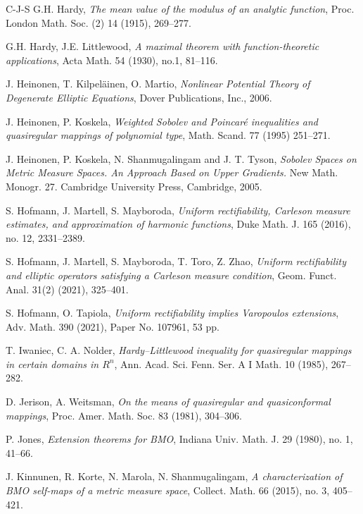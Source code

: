 \documentclass[11pt,a4paper,reqno]{amsart}
\theoremstyle{definition}
\numberwithin{komcounter}{section}
\begin{document}
\begin{thebibliography}{C-J-S}
 G.H. Hardy, \emph{The mean value of the modulus of an analytic function}, Proc. London Math. Soc. (2) 14 (1915), 269--277.

 G.H. Hardy, J.E. Littlewood, \emph{A maximal theorem with function-theoretic applications},
Acta Math. 54 (1930), no.1, 81--116.

 J. Heinonen, T. Kilpel\"ainen, O. Martio, \emph{Nonlinear Potential Theory of Degenerate Elliptic Equations}, Dover Publications, Inc., 2006.

 J. Heinonen, P. Koskela, \emph{Weighted Sobolev and Poincar\'e inequalities and quasiregular mappings of polynomial type}, Math. Scand. 77 (1995) 251--271.

 J. Heinonen, P. Koskela, N. Shanmugalingam and J. T. Tyson, \emph{Sobolev Spaces on Metric Measure Spaces. An Approach Based on Upper Gradients.} New Math. Monogr. 27. Cambridge University Press,  Cambridge, 2005.

  S. Hofmann, J. Martell, S. Mayboroda, \emph{Uniform rectifiability, Carleson measure estimates, and approximation of harmonic functions}, Duke Math. J. 165 (2016), no. 12, 2331--2389.

 S. Hofmann, J. Martell, S. Mayboroda, T. Toro, Z. Zhao, \emph{Uniform rectifiability and elliptic operators satisfying a Carleson measure condition}, Geom. Funct. Anal. 31(2) (2021), 325--401.

 S. Hofmann, O. Tapiola, \emph{Uniform rectifiability implies Varopoulos extensions}, Adv. Math. 390 (2021), Paper No. 107961, 53 pp.

 {T. Iwaniec, C. A. Nolder}, \emph{Hardy--Littlewood inequality for quasiregular mappings in certain domains in $R^n$}, Ann. Acad. Sci. Fenn. Ser. A I Math. 10 (1985), 267--282.


 D. Jerison, A. Weitsman, \textit{On the means of quasiregular and quasiconformal mappings}, Proc. Amer. Math. Soc. 83 (1981), 304--306.

 P. Jones, \emph{Extension theorems for BMO}, Indiana Univ. Math. J. 29 (1980), no. 1, 41--66.

 J. Kinnunen, R. Korte, N. Marola, N. Shanmugalingam, \emph{A characterization of BMO self-maps of a metric measure space}, Collect. Math. 66 (2015), no. 3, 405--421.


\end{thebibliography}
\end{document}
